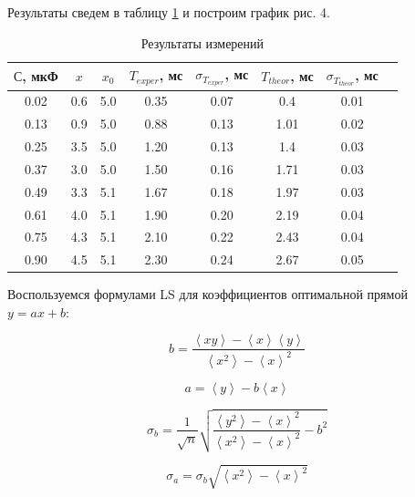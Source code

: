 \documentclass[a4paper, 14pt]{extarticle}
\begin{document}
Результаты сведем в таблицу \ref{resT} и построим график рис. 4. 

\begin{table}[h!]
	\centering
	\caption{Результаты измерений}
	\begin{tabular}{|c|c|c|c|c|c|c|c|}
		\hline
		$С$, мкФ & $x$ & $x_0$ & $T_{exper}$, мс & $\sigma_{T_{exper}}$, мс & $T_{theor}$, мс & $ \sigma_{T_{theor}} $, мс \\
		\hline
		0.02 & 0.6 & 5.0 & 0.35 & 0.07 & 0.4 & 0.01 \\
		0.13 & 0.9 & 5.0 & 0.88 & 0.13 & 1.01 & 0.02 \\
		0.25 & 3.5 & 5.0 & 1.20 & 0.13 & 1.4 & 0.03 \\
		0.37 & 3.0 & 5.0 & 1.50 & 0.16 & 1.71 & 0.03 \\
		0.49 & 3.3 & 5.1 & 1.67 & 0.18 & 1.97 & 0.03 \\
		0.61 & 4.0 & 5.1 & 1.90 & 0.20 & 2.19 & 0.04 \\
		0.75 & 4.3 & 5.1 & 2.10 & 0.22 & 2.43 & 0.04 \\
		0.90 & 4.5 & 5.1 & 2.30 & 0.24 & 2.67 & 0.05 \\
		\hline
	\end{tabular}%
\label{resT}%
\end{table}%

Воспользуемся формулами LS для коэффициентов оптимальной прямой $y = ax + b$:


\begin{equation}\label{}
b = \frac{\left\langle{xy}\right\rangle - \left\langle{x}\right\rangle \left\langle{y}\right\rangle}{\left\langle{x^2}\right\rangle - \left\langle{x}\right\rangle^2}
\end{equation}

\begin{equation}\label{}
a = \left\langle{y}\right\rangle - b\left\langle{x}\right\rangle
\end{equation}

\begin{equation}\label{}
\sigma_{b} = \frac{1}{\sqrt{n}}\sqrt{\frac{\left\langle{y^2}\right\rangle - \left\langle{x}\right\rangle^2}{\left\langle{x^2}\right\rangle - \left\langle{x}\right\rangle^2} - b^2}
\end{equation}

\begin{equation}\label{}
\sigma_{a} = \sigma_{b}\sqrt{\left\langle{x^2}\right\rangle - \left\langle{x}\right\rangle^2}
\end{equation}
\end{document}
